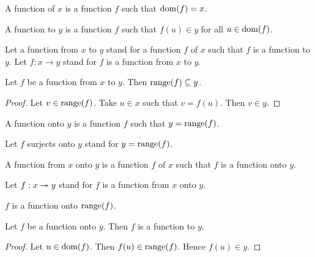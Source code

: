 \documentclass[../../sets-and-functions.ftl.tex]{subfiles}
\begin{document}
  \begin{forthel}
    \begin{definition}
      A function of $x$ is a function $f$ such that $\operatorname{dom}(f) = x$.
    \end{definition}

    \begin{definition}
      A function to $y$ is a function $f$ such that $f(u) \in y$ for all $u \in \operatorname{dom}(f)$.
    \end{definition}

    Let a function from $x$ to $y$ stand for a function $f$ of $x$ such that $f$ is a function to $y$.
    Let $f: x \to y$ stand for $f$ is a function from $x$ to $y$.

    \begin{proposition}[SF 02 01 694542]
      Let $f$ be a function from $x$ to $y$.
      Then $\operatorname{range}(f) \subseteq y$.
    \end{proposition}
    \begin{proof}
      Let $v \in \operatorname{range}(f)$.
      Take $u \in x$ such that $v = f(u)$.
      Then $v \in y$.
    \end{proof}

    \begin{definition}
      A function onto $y$ is a function $f$ such that $y = \operatorname{range}(f)$.
    \end{definition}

    Let $f$ surjects onto $y$ stand for $y = \operatorname{range}(f)$.

    \begin{definition}
      A function from $x$ onto $y$ is a function $f$ of $x$ such that $f$ is a function onto $y$.
    \end{definition}

    Let $f: x \twoheadrightarrow y$ stand for $f$ is a function from $x$ onto $y$.

    \begin{proposition}[SF 02 01 677451]
      $f$ is a function onto $\operatorname{range}(f)$.
    \end{proposition}

    \begin{proposition}[SF 02 01 495468]
      Let $f$ be a function onto $y$.
      Then $f$ is a function to $y$.
    \end{proposition}
    \begin{proof}
      Let $u \in \operatorname{dom}(f)$.
      Then $f(u) \in \operatorname{range}(f)$.
      Hence $f(u) \in y$.
    \end{proof}


\end{forthel}
\end{document}

